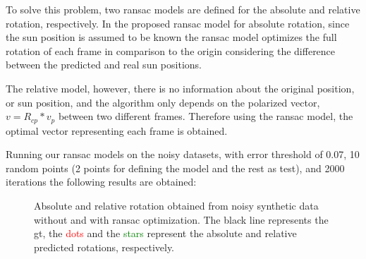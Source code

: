 To solve this problem, two ransac models are defined for the absolute and
relative rotation, respectively.  In the proposed ransac model for absolute
rotation, since the sun position is assumed to be known the ransac model
optimizes the full rotation of each frame in comparison to the origin
considering the difference between the predicted and real sun positions.

The relative model, however, there is no information about the original
position, or sun position, and the algorithm only depends on the polarized
vector, $v = R_{cp}*v_p$ between two different frames. Therefore using the ransac
model, the optimal vector representing each frame is obtained.

Running our ransac models on the noisy datasets, with error threshold of 0.07,
10 random points (2 points for defining the model and the rest as test), and
2000 iterations the following results are obtained:
\begin{figure}
  \centering
  \hfill
  \hspace*{\fill}
  \caption{Absolute and relative rotation obtained from  noisy synthetic data
    without and with ransac optimization. The black line represents the \gls{gt}, the
    \textcolor{red}{dots} and the \textcolor{green}{stars} represent the
    absolute and relative predicted rotations, respectively.}
  \label{fig:noisy-data}
\end{figure}

